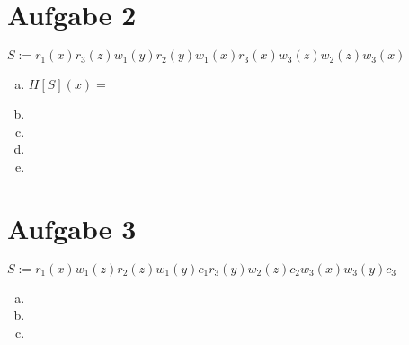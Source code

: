 \documentclass{scrartcl}
\begin{document}
\section*{Aufgabe 2}

$S := r_1(x)r_3(z)w_1(y)r_2(y)w_1(x)r_3(x)w_3(z)w_2(z)w_3(x)$
\begin{enumerate}[a)]
\item
$H[S](x) =  $

\item

\item

\item

\item

\end{enumerate}

\section*{Aufgabe 3}

$S := r_1(x)w_1(z)r_2(z)w_1(y)c_1r_3(y)w_2(z)c_2w_3(x)w_3(y)c_3$
\begin{enumerate}[a)]
\item

\item

\item

\end{enumerate}
\end{document}
